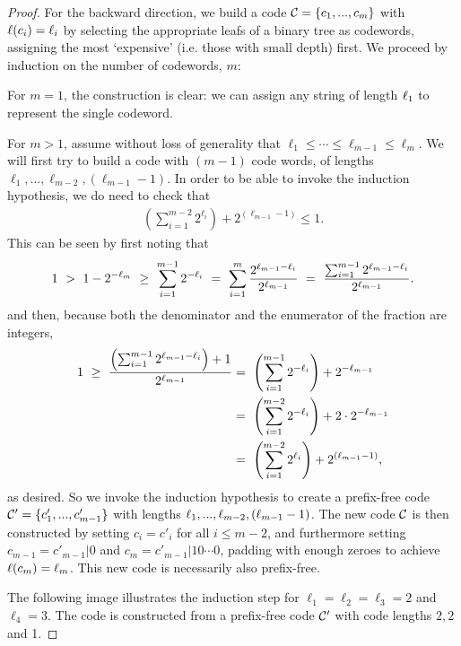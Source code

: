 \begin{proof}
For the backward direction, we build a code ${\cal C} = \{c_1, ..., c_m\}$ with $\ell(c_i) = \ell_i$ by selecting the appropriate leafs of a binary tree as codewords, assigning the most `expensive' (i.e. those with small depth) first. We proceed by induction on the number of codewords, $m$:

For $m = 1$, the construction is clear: we can assign any string of length $\ell_1$ to represent the single codeword.

For $m > 1$, assume without loss of generality that $\ell_1 \leq \cdots \leq \ell_{m-1} \leq \ell_{m}$. We will first try to build a code with $(m-1)$ code words, of lengths $\ell_1, ..., \ell_{m-2}, (\ell_{m-1} - 1)$. In order to be able to invoke the induction hypothesis, we do need to check that
\begin{align}
\left(\sum_{i=1}^{m-2} 2^{\ell_{i}}\right) + 2^{(\ell_{m-1} - 1)} \leq 1.
\end{align}
This can be seen by first noting that
\begin{align}
1 \ > \ 1 - 2^{-\len_m} \ \geq \ \sum_{i=1}^{m-1} 2^{-\len_i} \ = \ \sum_{i=1}^m \frac{2^{\len_{m-1} - \len_i}}{2^{\len_{m-1}}} \ = \ \frac{\sum_{i=1}^{m-1} 2^{\len_{m-1} - \len_i}}{2^{\len_{m-1}}}.
\end{align}
and then, because both the denominator and the enumerator of the fraction are integers,
\begin{align}
1
\ \geq \ \frac{\left(\sum_{i=1}^{m-1} 2^{\ell_{m-1} - \ell_i}\right) + 1}{2^{\ell_{m-1}}}
&= \ \left(\sum_{i=1}^{m-1} 2^{-\ell_i}\right) + 2^{-\ell_{m-1}}\nonumber\\
&= \ \left(\sum_{i=1}^{m-2} 2^{-\ell_i}\right) + 2\cdot 2^{-\ell_{m-1}}\nonumber\\
&= \ \left(\sum_{i=1}^{m-2} 2^{\ell_{i}}\right) + 2^{(\ell_{m-1} - 1)},
\end{align}
as desired. So we invoke the induction hypothesis to create a prefix-free code ${\cal C}' = \{c'_1, ..., c'_{m-1}\}$ with lengths $\ell_1, ..., \ell_{m-2}, (\ell_{m-1} - 1)$. The new code ${\cal C}$ is then constructed by setting $c_i = c'_i$ for all $i \leq m-2$, and furthermore setting $c_{m-1} = c'_{m-1}|0$ and $c_m = c'_{m-1}|10\cdots 0$, padding with enough zeroes to achieve $\ell(c_m) = \ell_m$. This new code is necessarily also prefix-free.

The following image illustrates the induction step for $\ell_1 = \ell_2 = \ell_3 = 2$ and $\ell_4 = 3$. The code is constructed from a prefix-free code ${\cal C}'$ with code lengths $2, 2$ and 1.


\end{proof}
